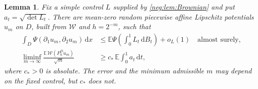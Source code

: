 \documentclass[11pt]{article}
\newtheorem{lemma}[lemma]{Lemma}
\theoremstyle{definition}
\theoremstyle{remark}
\numberwithin{equation}{section}
\begin{document}
\begin{lemma}
\label{neg:lem:spatial}
Fix a simple control $L$ supplied by \cref{neg:lem:Brownian} and put
$a_t=\sqrt{\det L_t}$. There are mean-zero random piecewise affine
Lipschitz potentials $u_m$ on $D$, built from $\mathcal W$ and
$h=2^{-m}$, such that
\begin{align}
 \int_D\Psi(\partial_1u_m,\partial_2u_m)\,\mathrm dx
   &\le\mathbb E\Psi\!\left(\int_0^1L_t\,\mathrm dB_t\right)
          +o_L(1)\quad\text{almost surely},
       \label{neg:eq:spatial-cost}\\
 \liminf_{m\to\infty}\frac{\mathbb E\,\mathcal W(P_h^Du_m)}{\sqrt m}
   &\ge c_*\,\mathbb E\int_0^1a_t\,\mathrm dt,
       \label{neg:eq:spatial-reward}
\end{align}
where $c_*>0$ is absolute. The error and the minimum admissible
$m$ may depend on the fixed control, but $c_*$ does not.
\end{lemma}
\end{document}

